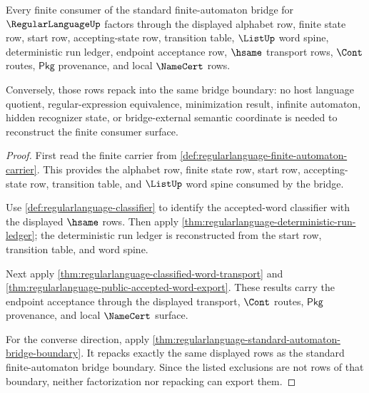 \begin{theorem}
\label{thm:regularlanguage-finite-bridge-consumer-completeness}
Every finite consumer of the standard finite-automaton bridge for
$\RegularLanguageUp$ factors through the displayed alphabet row, finite state
row, start row, accepting-state row, transition table, $\ListUp$ word spine,
deterministic run ledger, endpoint acceptance row, $\hsame$ transport rows,
$\Cont$ routes, $\mathsf{Pkg}$ provenance, and local $\NameCert$ rows.

Conversely, those rows repack into the same bridge boundary: no host language
quotient, regular-expression equivalence, minimization result, infinite
automaton, hidden recognizer state, or bridge-external semantic coordinate is
needed to reconstruct the finite consumer surface.
\end{theorem}
\begin{proof}
First read the finite carrier from
\autoref{def:regularlanguage-finite-automaton-carrier}. This provides the
alphabet row, finite state row, start row, accepting-state row, transition
table, and $\ListUp$ word spine consumed by the bridge.

Use \autoref{def:regularlanguage-classifier} to identify the accepted-word
classifier with the displayed $\hsame$ rows. Then apply
\autoref{thm:regularlanguage-deterministic-run-ledger}; the deterministic run
ledger is reconstructed from the start row, transition table, and word spine.

Next apply \autoref{thm:regularlanguage-classified-word-transport} and
\autoref{thm:regularlanguage-public-accepted-word-export}. These results carry
the endpoint acceptance through the displayed transport, $\Cont$ routes,
$\mathsf{Pkg}$ provenance, and local $\NameCert$ surface.

For the converse direction, apply
\autoref{thm:regularlanguage-standard-automaton-bridge-boundary}. It repacks
exactly the same displayed rows as the standard finite-automaton bridge
boundary. Since the listed exclusions are not rows of that boundary, neither
factorization nor repacking can export them.
\end{proof}

